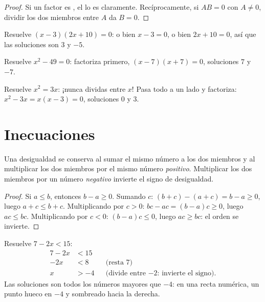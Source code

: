 \begin{proof}
Si un factor es , el  lo es claramente. Recíprocamente, si $A B = 0$ con
$A \neq 0$, dividir los dos miembros entre $A$ da $B = 0$.
\end{proof}

\begin{example}\label{ex:g9:algebra:zeroproduct}
Resuelve $(x - 3)(2x + 10) = 0$: o bien $x - 3 = 0$, o bien $2x + 10 = 0$, así que las
soluciones son $3$ y $-5$.

Resuelve $x^2 - 49 = 0$: factoriza primero, $(x-7)(x+7) = 0$, soluciones $7$ y
$-7$.

Resuelve $x^2 = 3x$: ¡nunca dividas entre $x$! Pasa todo a un lado y factoriza:
$x^2 - 3x = x(x - 3) = 0$, soluciones $0$ y $3$.
\end{example}

\section{Inecuaciones}

\begin{proposition}\label{prop:g9:algebra:ineq}
Una desigualdad se conserva al sumar el mismo número a los dos miembros y
al multiplicar los dos miembros por el mismo número \emph{positivo}.
Multiplicar los dos miembros por un número \emph{negativo} invierte el
signo de desigualdad.
\end{proposition}

\begin{proof}
Si $a \leq b$, entonces $b - a \geq 0$. Sumando $c$: $(b+c) - (a+c) = b - a
\geq 0$, luego $a + c \leq b + c$. Multiplicando por $c > 0$:
$bc - ac = (b-a)c \geq 0$, luego $ac \leq bc$. Multiplicando por $c < 0$:
$(b-a)c \leq 0$, luego $ac \geq bc$: el orden se invierte.
\end{proof}

\begin{example}\label{ex:g9:algebra:ineq}
Resuelve $7 - 2x < 15$:
\begin{align*}
7 - 2x &< 15 \\
-2x &< 8 && \text{(resta 7)} \\
x &> -4 && \text{(divide entre $-2$: invierte el signo).}
\end{align*}
Las soluciones son todos los números mayores que $-4$: en una recta numérica, un
punto hueco en $-4$ y sombreado hacia la derecha.
\end{example}

